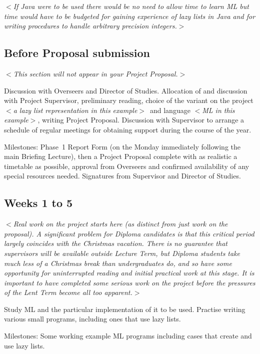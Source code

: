 \documentclass[12pt]{article}
\newcommand{\al}{$<$}
\newcommand{\ar}{$>$}
\begin{document}
\al\emph{If \hbox{Java} were to be used there would be no need to
  allow time to learn ML but time would have to be budgeted for
  gaining experience of lazy lists in Java and for writing
  procedures to handle arbitrary precision integers.}\ar


\subsection*{Before Proposal submission}

\al\emph{This section will not appear in your Project Proposal.}\ar
 
Discussion with Overseers and Director of Studies.  Allocation of and
discussion with Project Supervisor, preliminary reading, choice of the
variant on the project \al\emph{a lazy list representation in this
example}\ar\ and language \al\emph{ML in this example\/}\ar, writing
Project Proposal.  Discussion with Supervisor to arrange a schedule of
regular meetings for obtaining support during the course of the year.

Milestones: Phase~1 Report Form (on the Monday immediately following
the main Briefing Lecture), then a Project Proposal complete with as
realistic a timetable as possible, approval from Overseers and
confirmed availability of any special resources needed. Signatures
from Supervisor and Director of Studies.


\subsection*{Weeks 1 to 5}

\al\emph{Real work on the project starts here (as distinct from just
  work on the proposal).  A significant problem for Diploma candidates
  is that this critical period largely coincides with the Christmas
  vacation.  There is no guarantee that supervisors will be available
  outside Lecture Term, but Diploma students take much less of a
  Christmas break than undergraduates do, and so have some opportunity
  for uninterrupted reading and initial practical work at this stage.
  It is important to have completed some serious work on the project
  before the pressures of the Lent Term become all too apparent.}\ar

Study ML and the particular implementation of it to be used.  Practise
writing various small programs, including ones that use lazy lists.

Milestones: Some working example ML programs including cases that
create and use lazy lists.
\end{document}
